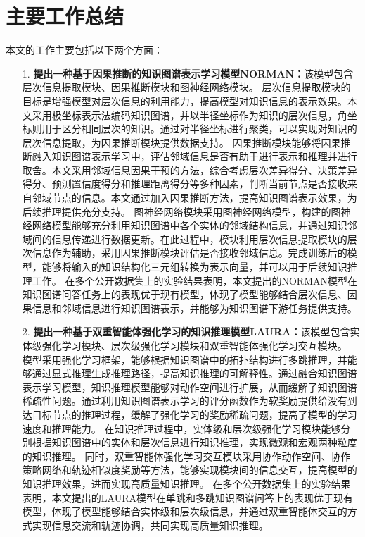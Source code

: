 \documentclass[algorithmlist, AutoFakeBold, AutoFakeSlant, figurelist, tablelist, nomlist, masters]{seuthesix}
\begin{document}
\section{主要工作总结}
本文的工作主要包括以下两个方面：
\begin{itemize}
  \item [1.]\textbf{提出一种基于因果推断的知识图谱表示学习模型NORMAN：}该模型包含层次信息提取模块、因果推断模块和图神经网络模块。
  层次信息提取模块的目标是增强模型对层次信息的利用能力，提高模型对知识信息的表示效果。本文采用极坐标表示法编码知识图谱，并以半径坐标作为知识的层次信息，角坐标则用于区分相同层次的知识。通过对半径坐标进行聚类，可以实现对知识的层次信息提取，为因果推断模块提供数据支持。
  因果推断模块能够将因果推断融入知识图谱表示学习中，评估邻域信息是否有助于进行表示和推理并进行取舍。本文采用邻域信息因果干预的方法，综合考虑层次差异得分、决策差异得分、预测置信度得分和推理距离得分等多种因素，判断当前节点是否接收来自邻域节点的信息。本文通过加入因果推断方法，提高知识图谱表示效果，为后续推理提供充分支持。
  图神经网络模块采用图神经网络模型，构建的图神经网络模型能够充分利用知识图谱中各个实体的邻域结构信息，并通过知识邻域间的信息传递进行数据更新。在此过程中，模块利用层次信息提取模块的层次信息作为辅助，采用因果推断模块评估是否接收邻域信息。完成训练后的模型，能够将输入的知识结构化三元组转换为表示向量，并可以用于后续知识推理工作。
  在多个公开数据集上的实验结果表明，本文提出的NORMAN模型在知识图谱问答任务上的表现优于现有模型，体现了模型能够结合层次信息、因果信息和邻域信息进行知识图谱表示，并能够为知识图谱下游任务提供支持。
  \item [2.]\textbf{提出一种基于双重智能体强化学习的知识推理模型LAURA：}该模型包含实体级强化学习模块、层次级强化学习模块和双重智能体强化学习交互模块。
  模型采用强化学习框架，能够根据知识图谱中的拓扑结构进行多跳推理，并能够通过显式推理生成推理路径，提高知识推理的可解释性。通过融合知识图谱表示学习模型，知识推理模型能够对动作空间进行扩展，从而缓解了知识图谱稀疏性问题。通过利用知识图谱表示学习的评分函数作为软奖励提供给没有到达目标节点的推理过程，缓解了强化学习的奖励稀疏问题，提高了模型的学习速度和推理能力。
  在知识推理过程中，实体级和层次级强化学习模块能够分别根据知识图谱中的实体和层次信息进行知识推理，实现微观和宏观两种粒度的知识推理。
  同时，双重智能体强化学习交互模块采用协作动作空间、协作策略网络和轨迹相似度奖励等方法，能够实现模块间的信息交互，提高模型的知识推理效果，进而实现高质量知识推理。
  在多个公开数据集上的实验结果表明，本文提出的LAURA模型在单跳和多跳知识图谱问答上的表现优于现有模型，体现了模型能够结合实体级和层次级信息，并通过双重智能体交互的方式实现信息交流和轨迹协调，共同实现高质量知识推理。
\end{itemize}
\end{document}
